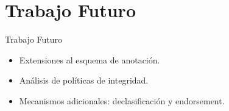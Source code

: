  \section{Trabajo Futuro}
	
\begin{frame}{Trabajo Futuro}
	\begin{block}{}
	\begin{itemize}
	  \item Extensiones al esquema de anotación.
	  \item Análisis de políticas de integridad.
	  \item Mecanismos adicionales: declasificación y endorsement.
	\end{itemize}
	\end{block}
\end{frame}